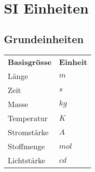 



\section{SI Einheiten}
\subsection{Grundeinheiten}
\begin{tabular}{ll}
  \rowcolor{white} \textbf{Basisgrösse} & \textbf{Einheit}\\
  \rowcolor{lgray} Länge                & $m$\\
  \rowcolor{white} Zeit                 & $s$\\
  \rowcolor{lgray} Masse                & $kg$\\
  \rowcolor{white} Temperatur           & $K$\\
  \rowcolor{lgray} Stromstärke          & $A$\\
  \rowcolor{white} Stoffmenge           & $mol$\\
  \rowcolor{lgray} Lichtstärke          & $cd$\\
\end{tabular}